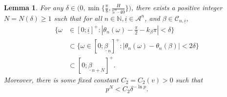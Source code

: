 \documentclass{amsart}
\newtheorem{lemma}{Lemma}
\newcommand{\NN}{\mathbb{N}}
\newcommand{\A}{\mathcal{A}}
\newcommand{\C}{\mathcal{C}}
\begin{document}
\begin{lemma}\label{l.subsets}
    For any $\delta\in \Big(0, \min\{\frac{\pi}{8}, \frac{H}{5^\alpha \cdot 40}\}\Big)$, there exists a positive integer $N = N(\delta)\geq 1$ such that for all $n\in \NN, \underline{i}\in \A^n$, and  $\beta\in \C_{n,\underline{i}}$, \begin{align}
        \{\omega&\in [0;\underline{i}]^+: |\theta_n(\omega) - \frac{\pi}{2} -k_{\beta}\pi|<\delta \}\label{e.relatesubsets}\\
        &\subset \{\omega\in [0;\underline{\beta}_n]^+: |\theta_n(\omega) - \theta_n(\beta)| <2\delta\} \nonumber\\
        &\subset [0;\underline{\beta}_{n + N}]^+. \nonumber
    \end{align}
    Moreover, there is some fixed constant $C_2 = C_2(v) > 0$ such that 
    \[p^{N} < C_2\delta^{-\ln p}.\]
\end{lemma}
\end{document}
